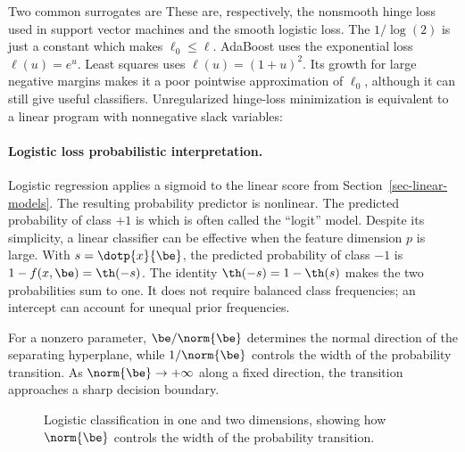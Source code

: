 Two common surrogates are
These are, respectively, the nonsmooth hinge loss used in support vector machines and the smooth logistic loss. The $1/\log(2)$ is just a constant which makes $\ell_0 \leq \ell$.
% 
AdaBoost uses the exponential loss $\ell(u)=e^u$.
%
Least squares uses $\ell(u)=(1+u)^2$. Its growth for large negative margins makes it a poor pointwise approximation of $\ell_0$, although it can still give useful classifiers.
% 
Unregularized hinge-loss minimization is equivalent to a linear program with nonnegative slack variables:


\paragraph{Logistic loss probabilistic interpretation.}

Logistic regression applies a sigmoid to the linear score from Section~\ref{sec-linear-models}. The resulting probability predictor is nonlinear. The predicted probability of class $+1$ is
which is often called the ``logit'' model.
%
Despite its simplicity, a linear classifier can be effective when the feature dimension $p$ is large.
%
With $s=\dotp{x}{\be}$, the predicted probability of class $-1$ is $1-f(x,\be)=\th(-s)$. The identity $\th(-s)=1-\th(s)$ makes the two probabilities sum to one. It does not require balanced class frequencies; an intercept can account for unequal prior frequencies.

For a nonzero parameter, $\be/\norm{\be}$ determines the normal direction of the separating hyperplane, while $1/\norm{\be}$ controls the width of the probability transition. As $\norm{\be} \rightarrow +\infty$ along a fixed direction, the transition approaches a sharp decision boundary.

\begin{figure}[tbp]
\centering
{}\hfill
{}
\caption{Logistic classification in one and two dimensions, showing how $\norm{\be}$ controls the width of the probability transition.}
\label{fig-logistic-sharpness}
\end{figure}

